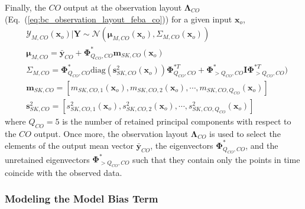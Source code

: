 Finally, the $CO$ output at the observation layout $\boldsymbol{\Lambda}_{CO}$ (Eq.~(\ref{eq:bc_observation_layout_feba_co})) for a given input $\bm{x}_o$,
\begin{equation}
	\begin{split}
		& \bm{\mathcal{Y}}_{M,CO} (\bm{x}_o) | \mathbf{Y} \sim \mathcal{N} (\boldsymbol{\mu}_{M,CO} (\bm{x}_o), \Sigma_{M,CO} (\bm{x}_o)) \\
		& \boldsymbol{\mu}_{M,CO}  = \bar{\mathbf{y}}_{CO} + \boldsymbol{\Phi}^*_{Q_{CO},CO} \mathbf{m}_{SK,CO}(\bm{x}_o) \\
		& \Sigma_{M,CO} = \boldsymbol{\Phi}^*_{Q_{CO},CO} \text{diag}(\mathbf{s}^2_{SK,CO}(\bm{x}_o)) \boldsymbol{\Phi}^{*T}_{Q_{CO},CO} + \boldsymbol{\Phi}^*_{>Q_{CO},CO} \mathbf{I}\boldsymbol{\Phi}^{*T}_{>Q_{CO},CO}) \\
		& \mathbf{m}_{SK,CO} = [m_{SK,CO,1}(\bm{x}_o), m_{SK,CO,2}(\bm{x}_o), \cdots, m_{SK,CO,Q_{CO}}(\bm{x}_o)] \\
		& \mathbf{s}^2_{SK,CO} = [s^2_{SK,CO,1}(\bm{x}_o), s^2_{SK,CO,2}(\bm{x}_o), \cdots, s^2_{SK,CO,Q_{CO}}(\bm{x}_o)]
	\end{split}
\label{eq:p_variate_metamodel_co}
\end{equation}
where $Q_{CO} = 5$ is the number of retained principal components with respect to the $CO$ output.
Once more, the observation layout $\boldsymbol{\Lambda}_{CO}$ is used to select the elements of the output mean vector $\bar{\mathbf{y}}_{CO}$, the eigenvectors $\boldsymbol{\Phi}^*_{Q_{CO},CO}$, and the unretained eigenvectors $\boldsymbol{\Phi}^*_{>Q_{CO},CO}$ such that they contain only the points in time coincide with the observed data.

\subsubsection{Modeling the Model Bias Term}\label{subsub:bc_model_bias}

